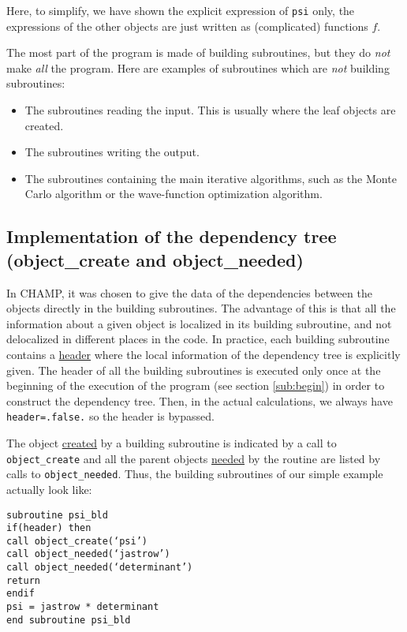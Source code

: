 \documentclass[a4paper,11pt]{article}
\newcommand\Def[1]{\underline{#1}}
\begin{document}
\vspace{0.5cm}
\noindent
Here, to simplify, we have shown the explicit expression of {\tt psi} only, the expressions of the other objects are just written as (complicated) functions $f$.

\vspace{0.5cm}
The most part of the program is made of building subroutines, but they do {\it not} make {\it all} the program. Here are examples of subroutines which are {\it not} building subroutines:
\begin{itemize}
\item The subroutines reading the input. This is usually where the leaf objects are created.
\item The subroutines writing the output.
\item The subroutines containing the main iterative algorithms, such as the Monte Carlo algorithm or the wave-function optimization algorithm.
\end{itemize}

\subsection{Implementation of the dependency tree (object_create and object_needed)}

In CHAMP, it was chosen to give the data of the dependencies between the objects directly in the building subroutines. The advantage of this is that all the information about a given object is localized in its building subroutine, and not delocalized in different places in the code.
In practice, each building subroutine contains a \Def{header} where the local information of the dependency tree is explicitly given.
The header of all the building subroutines is executed only once at the beginning of the execution of the program (see section \ref{sub:begin}) in order to construct the dependency tree. Then, in the actual calculations, we always have {\tt header=.false.} so the header is bypassed.

The object \Def{created} by a building subroutine is indicated by a call to {\tt object_create} and all the parent objects \Def{needed} by the routine are listed by calls to {\tt object_needed}.
Thus, the building subroutines of our simple example actually look like:

\vspace{0.5cm}
\noindent
{\tt subroutine psi_bld\\
if(header) then\\
\phantom{xx} call object_create(`psi')\\
\phantom{xx} call object_needed(`jastrow')\\
\phantom{xx} call object_needed(`determinant')\\
\phantom{xx} return\\
endif\\
psi = jastrow * determinant\\
end subroutine psi_bld}
\end{document}
